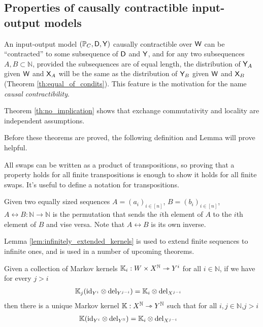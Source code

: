 \subsection[Causally contractible sequences]{Properties of causally contractible input-output models}

An input-output model $(\mathbb{P}_C,\mathsf{D},\mathsf{Y})$ causally contractible over $\mathsf{W}$ can be ``contracted'' to some subsequence of $\mathsf{D}$ and $\mathsf{Y}$, and for any two subsequences $A,B\subset\mathbb{N}$, provided the subsequences are of equal length, the distribution of $\mathsf{Y}_A$ given $\mathsf{W}$ and $\mathsf{X}_A$ will be the same as the distribution of $\mathsf{Y}_B$ given $\mathsf{W}$ and $\mathsf{X}_B$ (Theorem \ref{th:equal_of_condits}). This feature is the motivation for the name \emph{causal contractibility}. 

Theorem \ref{th:no_implication} shows that exchange commutativity and locality are independent assumptions.

Before these theorems are proved, the following definition and Lemma will prove helpful.

All swaps can be written as a product of transpositions, so proving that a property holds for all finite transpositions is enough to show it holds for all finite swaps. It's useful to define a notation for transpositions.
\begin{definition}
Given two equally sized sequences $A=(a_i)_{i\in [n]}$, $B=(b_i)_{i\in [n]}$, ${A\leftrightarrow B}:\mathbb{N}\to \mathbb{N}$ is the permutation that sends the $i$th element of $A$ to the $i$th element of $B$ and vise versa. Note that $A\leftrightarrow B$ is its own inverse.
\end{definition}

Lemma \ref{lem:infinitely_extended_kernels} is used to extend finite sequences to infinite ones, and is used in a number of upcoming theorems.

\begin{lemma}\label{lem:infinitely_extended_kernels}
Given a collection of Markov kernels $\mathbb{K}_i:W\times X^{\mathbb{N}}\rightarrowtriangle Y^i$ for all $i\in \mathbb{N}$, if we have for every $j>i$
\begin{align}
    \mathbb{K}_j(\text{id}_{Y^i}\otimes \text{del}_{Y^{j-i}}) &= \mathbb{K}_i\otimes \text{del}_{X^{j-i}}\label{eq:marginalise_comb}
\end{align} 
then there is a unique Markov kernel $\mathbb{K}:X^{\mathbb{N}}\rightarrowtriangle Y^{\mathbb{N}}$ such that for all $i,j\in \mathbb{N}$,$j>i$
\begin{align}
    \mathbb{K}(\text{id}_{Y^i}\otimes \text{del}_{Y^{\mathbb{N}}})&= \mathbb{K}_i\otimes \text{del}_{X^{j-i}}
\end{align}
\end{lemma}

